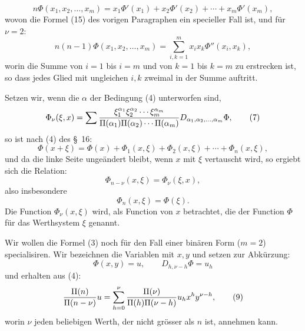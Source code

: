 
\begin{equation}
 n\Phi(x_1,x_2,\ldots,x_m)
 =x_1\Phi'(x_1)+x_2\Phi'(x_2)+\cdots+x_m\Phi'(x_m),
\tag{5}
\end{equation}
wovon die Formel (15) des vorigen Paragraphen ein specieller Fall ist, und für $\nu=2$:
\begin{equation}
 n(n-1)\Phi(x_1,x_2,\ldots,x_m)
 =
 \sum_{i,k=1}^{m}x_i x_k\Phi''(x_i,x_k),
\tag{6}
\end{equation}
worin die Summe von $i=1$ bis $i=m$ und von $k=1$ bis $k=m$ zu erstrecken ist, so dass jedes Glied mit ungleichen $i,k$ zweimal in der Summe auftritt.

Setzen wir, wenn die $\alpha$ der Bedingung (4) unterworfen sind,
\begin{equation}
 \Phi_\nu(\xi,x)=
 \sum {\xi_1^{\alpha_1}\xi_2^{\alpha_2}\cdots\xi_m^{\alpha_m}
 \over \Pi(\alpha_1)\Pi(\alpha_2)\cdots\Pi(\alpha_m)}
 D_{\alpha_1,\alpha_2,\ldots,\alpha_m}\Phi,
\tag{7}
\end{equation}
so ist nach (4) des \S~16:
\begin{equation}
 \Phi(x+\xi)=\Phi(x)+\Phi_1(x,\xi)+\Phi_2(x,\xi)+\cdots+\Phi_n(x,\xi),
\tag{8}
\end{equation}
und da die linke Seite ungeändert bleibt, wenn $x$ mit $\xi$ vertauscht wird, so ergiebt sich die Relation:
\begin{equation}
 \Phi_{n-\nu}(x,\xi)=\Phi_\nu(\xi,x),
\tag{9}
\end{equation}
also insbesondere
\begin{equation}
 \Phi_n(x,\xi)=\Phi(\xi).
\tag{10}
\end{equation}
Die Function $\Phi_\nu(x,\xi)$ wird, als Function von $x$ betrachtet, die  der Function $\Phi$ für das Werthsystem $\xi$ genannt.

Wir wollen die Formel (3) noch für den Fall einer binären Form ($m=2$) specialisiren. Wir bezeichnen die Variablen mit $x,y$ und setzen zur Abkürzung:
\[
 \Phi(x,y)=u,\qquad D_{h,\nu-h}\Phi=u_h
\]
und erhalten aus (4):
\begin{equation}
 {\Pi(n)\over\Pi(n-\nu)}u
 =
 \sum_{h=0}^{\nu}{\Pi(\nu)\over\Pi(h)\Pi(\nu-h)}
 u_h x^h y^{\nu-h},
\tag{9}%
\end{equation}
worin $\nu$ jeden beliebigen Werth, der nicht grösser als $n$ ist, annehmen kann.
